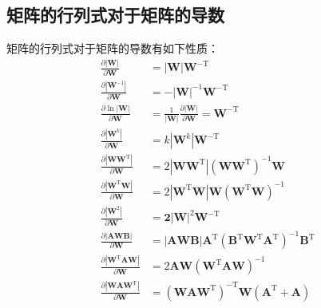\documentclass[UTF8,space=auto]{ctexart} %
\begin{document}
\subsection{矩阵的行列式对于矩阵的导数}
矩阵的行列式对于矩阵的导数有如下性质：
\begin{align}
\frac{\partial|\mathbf{W}|}{\partial \mathbf{W}} &= |\mathbf{W}| \mathbf{W}^{-\mathrm{T}} \\
\frac{\partial\left|\mathbf{W}^{-1}\right|}{\partial \mathbf{W}}&=-|\mathbf{W}|^{-1}\mathbf{W}^{-\mathrm{T}} \\
\frac{\partial \ln |\mathbf{W}|}{\partial \mathbf{W}} &=\frac{1}{|\mathbf{W}|} \frac{\partial|\mathbf{W}|}{\partial \mathbf{W}} = \mathbf{W}^{-\mathrm{T}} \\
\frac{\partial\left|\mathbf{W}^{k}\right|}{\partial \mathbf{W}} &= k\left|\mathbf{W}^{k}\right| \mathbf{W}^{-\mathrm{T}} \\
\frac{\partial\left|\mathbf{W} \mathbf{W}^{\mathrm{T}}\right|}{\partial \mathbf{W}}&=2\left|\mathbf{W} \mathbf{W}^{\mathrm{T}}\right|\left(\mathbf{W} \mathbf{W}^{\mathrm{T}}\right)^{-1} \mathbf{W} \\
\frac{\partial\left|\mathbf{W}^{\mathrm{T}} \mathbf{W}\right|}{\partial \mathbf{W}}&=2\left|\mathbf{W}^{\mathrm{T}} \mathbf{W}\right| \mathbf{W}\left(\mathbf{W}^{\mathrm{T}} \mathbf{W}\right)^{-1} \\
\frac{\partial\left|\mathbf{W}^{2}\right|}{\partial \mathbf{W}}&=\mathbf{2}|\mathbf{W}|^{2} \mathbf{W}^{-\mathrm{T}} \\
\frac{\partial|\mathbf{A} \mathbf{W} \mathbf{B}|}{\partial \mathbf{W}}&=|\mathbf{A} \mathbf{W} \mathbf{B}| \mathbf{A}^{\mathrm{T}}\left(\mathbf{B}^{\mathrm{T}} \mathbf{W}^{\mathrm{T}} \mathbf{A}^{\mathrm{T}}\right)^{-1} \mathbf{B}^{\mathrm{T}} \\
\frac{\partial\left|\mathbf{W}^{\mathrm{T}} \mathbf{A} \mathbf{W}\right|}{\partial \mathbf{W}}&=2 \mathbf{A} \mathbf{W}\left(\mathbf{W}^{\mathrm{T}} \mathbf{A} \mathbf{W}\right)^{-1} \\
\frac{\partial\left|\mathbf{W} \mathbf{A} \mathbf{W}^{\mathrm{T}}\right|}{\partial \mathbf{W}}&=\left(\mathbf{W} \mathbf{A} \mathbf{W}^{\mathrm{T}}\right)^{-\mathrm{T}} \mathbf{W}\left(\mathbf{A}^{\mathrm{T}}+\mathbf{A}\right)
\end{align}
\end{document}
